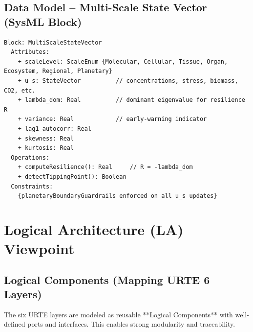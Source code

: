 \documentclass[11pt,a4paper]{report}
\begin{document}
\section{Data Model -- Multi-Scale State Vector (SysML Block)}

\begin{lstlisting}[style=sysmlstyle, caption={Data Model: Multi-Scale State Vector (SysML Block Definition)}]
Block: MultiScaleStateVector
  Attributes:
    + scaleLevel: ScaleEnum {Molecular, Cellular, Tissue, Organ, Ecosystem, Regional, Planetary}
    + u_s: StateVector          // concentrations, stress, biomass, CO2, etc.
    + lambda_dom: Real          // dominant eigenvalue for resilience R
    + variance: Real            // early-warning indicator
    + lag1_autocorr: Real
    + skewness: Real
    + kurtosis: Real
  Operations:
    + computeResilience(): Real     // R = -lambda_dom
    + detectTippingPoint(): Boolean
  Constraints:
    {planetaryBoundaryGuardrails enforced on all u_s updates}
\end{lstlisting}

\chapter{Logical Architecture (LA) Viewpoint}

\section{Logical Components (Mapping URTE 6 Layers)}

The six URTE layers are modeled as reusable **Logical Components** with well-defined ports and interfaces. This enables strong modularity and traceability.
\end{document}
